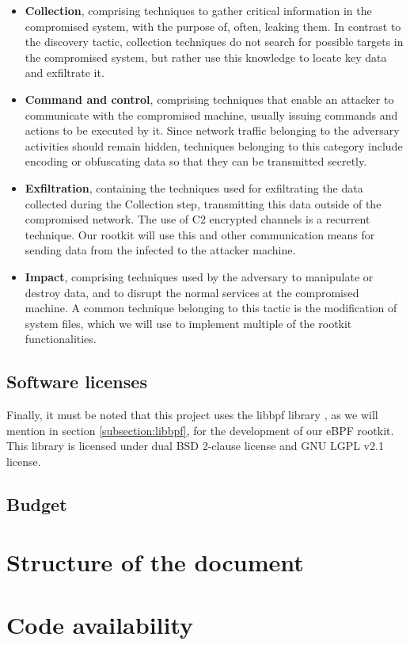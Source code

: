 \begin{itemize}
\item \textbf{Collection}, comprising techniques to gather critical information in the compromised system, with the purpose of, often, leaking them. In contrast to the discovery tactic, collection techniques do not search for possible targets in the compromised system, but rather use this knowledge to locate key data and exfiltrate it.
\item \textbf{Command and control}, comprising techniques that enable an attacker to communicate with the compromised machine, usually issuing commands and actions to be executed by it. Since network traffic belonging to the adversary activities should remain hidden, techniques belonging to this category include encoding or obfuscating data so that they can be transmitted secretly.
\item \textbf{Exfiltration}, containing the techniques used for exfiltrating the data collected during the Collection step, transmitting this data outside of the compromised network. The use of C2 encrypted channels is a recurrent technique. Our rootkit will use this and other communication means for sending data from the infected to the attacker machine.
\item \textbf{Impact}, comprising techniques used by the adversary to manipulate or destroy data, and to disrupt the normal services at the compromised machine. A common technique belonging to this tactic is the modification of system files, which we will use to implement multiple of the rootkit functionalities.
\end{itemize}

\subsection{Software licenses}
Finally, it must be noted that this project uses the libbpf library \cite{libbpf_github}, as we will mention in section \ref{subsection:libbpf}, for the development of our eBPF rootkit. This library is licensed under dual BSD 2-clause license and GNU LGPL v2.1 license. 

\subsection{Budget}

\section{Structure of the document}

\section{Code availability}

